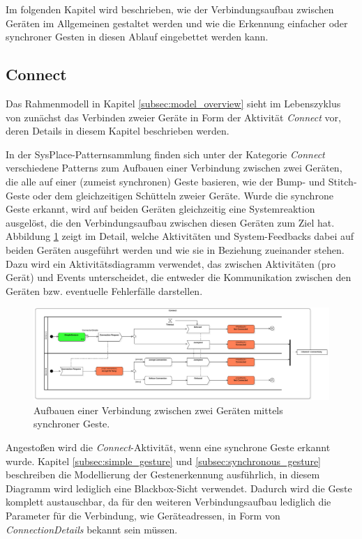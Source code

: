 Im folgenden Kapitel wird beschrieben, wie der Verbindungsaufbau zwischen Geräten im Allgemeinen gestaltet werden und wie die Erkennung einfacher oder synchroner Gesten in diesen Ablauf eingebettet werden kann.

\subsection{Connect}
\label{subsec:connect}
Das Rahmenmodell in Kapitel \ref{subsec:model_overview} sieht im Lebenszyklus von \msas zunächst das Verbinden zweier Geräte in Form der Aktivität 
\textit{Connect} vor, deren Details in diesem Kapitel beschrieben werden.

In der SysPlace-Patternsammlung finden sich unter der Kategorie \textit{Connect} verschiedene Patterns zum Aufbauen einer Verbindung zwischen zwei Geräten, die alle auf einer (zumeist synchronen) Geste basieren, wie \zb der Bump- und Stitch-Geste oder dem gleichzeitigen Schütteln zweier Geräte. Wurde die synchrone Geste erkannt, wird auf beiden Geräten gleichzeitig eine Systemreaktion ausgelöst, die den Verbindungsaufbau zwischen diesen Geräten zum Ziel hat. Abbildung \ref{fig:sync_connect} zeigt im Detail, welche Aktivitäten und System-Feedbacks dabei auf beiden Geräten ausgeführt werden und wie sie in Beziehung zueinander stehen. Dazu wird ein Aktivitätsdiagramm verwendet, das zwischen Aktivitäten (pro Gerät) und Events unterscheidet, die entweder die Kommunikation zwischen den Geräten bzw. eventuelle Fehlerfälle darstellen.
\begin{figure}
\centering
\includegraphics[page=2, width=\textwidth]{bilder/connect.pdf}
\caption{Aufbauen einer Verbindung zwischen zwei Geräten mittels synchroner Geste.}
\label{fig:sync_connect}
\end{figure}

Angestoßen wird die \textit{Connect}-Aktivität, wenn eine synchrone Geste erkannt wurde. Kapitel \ref{subsec:simple_gesture} und \ref{subsec:synchronous_gesture} beschreiben die Modellierung der Gestenerkennung ausführlich, in diesem Diagramm wird lediglich eine Blackbox-Sicht verwendet. Dadurch wird die Geste komplett austauschbar, da für den weiteren Verbindungsaufbau lediglich die Parameter für die Verbindung, wie \zb Geräteadressen, in Form von \textit{ConnectionDetails} bekannt sein müssen. 

